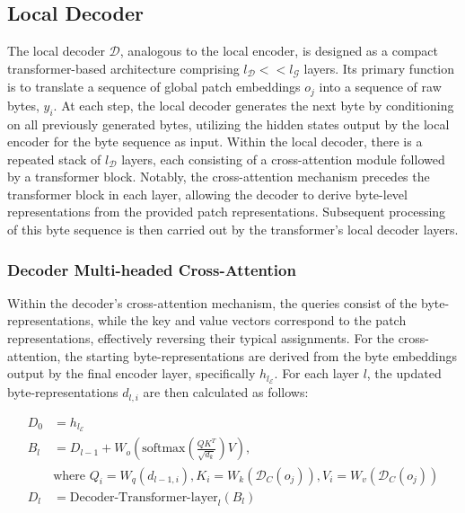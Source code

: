\subsection{Local Decoder} 

The local decoder $\mathcal{D}$, analogous to the local encoder, is designed as a compact transformer-based architecture comprising $l_{\mathcal{D}} << l_{\mathcal{G}}$ layers. Its primary function is to translate a sequence of global patch embeddings $o_j$ into a sequence of raw bytes, $y_i$. At each step, the local decoder generates the next byte by conditioning on all previously generated bytes, utilizing the hidden states output by the local encoder for the byte sequence as input. Within the local decoder, there is a repeated stack of $l_{\mathcal{D}}$ layers, each consisting of a cross-attention module followed by a transformer block. Notably, the cross-attention mechanism precedes the transformer block in each layer, allowing the decoder to derive byte-level representations from the provided patch representations. Subsequent processing of this byte sequence is then carried out by the transformer's local decoder layers.

\subsubsection{Decoder Multi-headed Cross-Attention} 

Within the decoder's cross-attention mechanism, the queries consist of the byte-representations, while the key and value vectors correspond to the patch representations, effectively reversing their typical assignments. For the cross-attention, the starting byte-representations are derived from the byte embeddings output by the final encoder layer, specifically $h_{l_{\mathcal{E}}}$. For each layer $l$, the updated byte-representations $d_{l,i}$ are then calculated as follows:

\begin{align}
D_0 &= h_{l_{\mathcal{E}}} \\
B_l &= D_{l-1} + W_o\left(\text{softmax}\left(\frac{QK^T}{\sqrt{d_k}}\right)V\right), \\
  &\text{where } Q_i = W_q(d_{l-1,i}), K_i = W_k(\mathcal{D}_C(o_j)), V_i = W_v(\mathcal{D}_C(o_j)) \\
  D_l &= \text{Decoder-Transformer-layer}_l(B_l)
\end{align}

